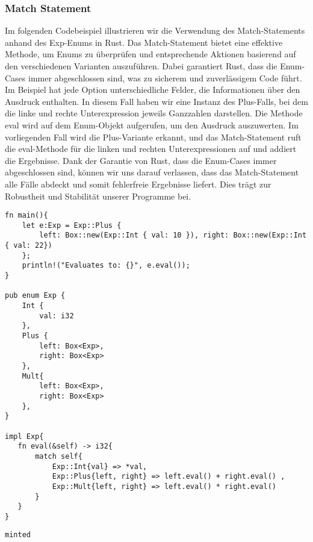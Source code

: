 \documentclass[a4paper, 1ppt]{article}
\begin{document}
\subsubsection{Match Statement}
Im folgenden Codebeispiel illustrieren wir die Verwendung des Match-Statements anhand des Exp-Enums in Rust. Das Match-Statement bietet eine effektive Methode, um Enums zu überprüfen und entsprechende Aktionen basierend auf den verschiedenen Varianten auszuführen. Dabei garantiert Rust, dass die Enum-Cases immer abgeschlossen sind, was zu sicherem und zuverlässigem Code führt.
Im Beispiel hat jede Option unterschiedliche Felder, die Informationen über den Ausdruck enthalten. In diesem Fall haben wir eine Instanz des Plus-Falls, bei dem die linke und rechte Unterexpression jeweils Ganzzahlen darstellen.
Die Methode eval wird auf dem Enum-Objekt aufgerufen, um den Ausdruck auszuwerten.  Im vorliegenden Fall wird die Plus-Variante erkannt, und das Match-Statement ruft die eval-Methode für die linken und rechten Unterexpressionen auf und addiert die Ergebnisse.
Dank der Garantie von Rust, dass die Enum-Cases immer abgeschlossen sind, können wir uns darauf verlassen, dass das Match-Statement alle Fälle abdeckt und somit fehlerfreie Ergebnisse liefert. Dies trägt zur Robustheit und Stabilität unserer Programme bei.
\begin{verbatim}
fn main(){
    let e:Exp = Exp::Plus { 
        left: Box::new(Exp::Int { val: 10 }), right: Box::new(Exp::Int { val: 22})
    };
    println!("Evaluates to: {}", e.eval());
}

pub enum Exp {
    Int {
        val: i32
    },
    Plus {
        left: Box<Exp>,
        right: Box<Exp>
    },
    Mult{
        left: Box<Exp>,
        right: Box<Exp>
    },
}

impl Exp{
   fn eval(&self) -> i32{
       match self{
           Exp::Int{val} => *val,
           Exp::Plus{left, right} => left.eval() + right.eval() ,
           Exp::Mult{left, right} => left.eval() * right.eval()
       }
   }
}
\end{verbatim}
\begin{verbatim}
minted\end{verbatim}
\end{document}
